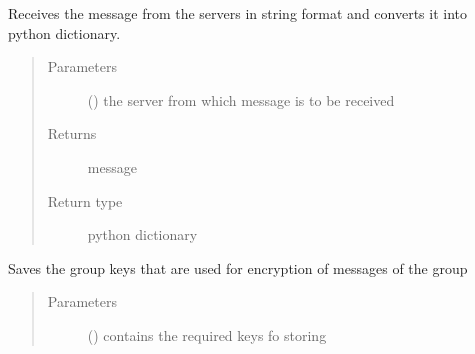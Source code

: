 \documentclass[letterpaper,10pt,english]{sphinxmanual}
\begin{document}

\begin{fulllineitems}
\label{\detokenize{client:client.rec_text}}
Receives the message from the servers in string format and converts it into python dictionary.
\begin{quote}\begin{description}
\item[{Parameters}] \leavevmode
{} () \textendash{} the server from which message is to be received

\item[{Returns}] \leavevmode
message

\item[{Return type}] \leavevmode
python dictionary

\end{description}\end{quote}

\end{fulllineitems}


\begin{fulllineitems}
\label{\detokenize{client:client.save_group_keys}}
Saves the group keys that are used for encryption of messages of the group
\begin{quote}\begin{description}
\item[{Parameters}] \leavevmode
{} () \textendash{} contains the required keys fo storing

\end{description}\end{quote}

\end{fulllineitems}

\end{document}

